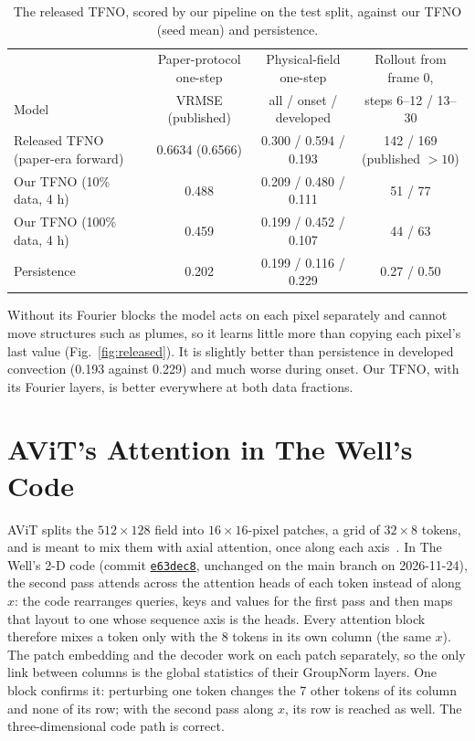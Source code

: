\documentclass[11pt]{article}
\begin{document}
\begin{table}[tp]
\centering\footnotesize
\begin{tabular}{@{}lccc@{}}
\toprule
& Paper-protocol one-step & Physical-field one-step & Rollout from frame 0, \\
Model & VRMSE (published) & all / onset / developed & steps 6--12 / 13--30 \\
\midrule
Released TFNO (paper-era forward) & 0.6634 (0.6566) & 0.300 / 0.594 / 0.193 & 142 / 169 (published $>10$) \\
Our TFNO (10\% data, 4 h) & 0.488 & 0.209 / 0.480 / 0.111 & 51 / 77 \\
Our TFNO (100\% data, 4 h) & 0.459 & 0.199 / 0.452 / 0.107 & 44 / 63 \\
Persistence & 0.202 & 0.199 / 0.116 / 0.229 & 0.27 / 0.50 \\
\bottomrule
\end{tabular}
\caption{The released TFNO, scored by our pipeline on the test split, against our TFNO (seed mean) and
persistence.}
\label{tab:released_tfno}
\end{table}

Without its Fourier blocks the model acts on each pixel separately and cannot move structures such as plumes, so it
learns little more than copying each pixel's last value (Fig.~\ref{fig:released}). It is slightly better than
persistence in developed convection (0.193 against 0.229) and much worse during onset. Our TFNO, with its Fourier
layers, is better everywhere at both data fractions.

\section{AViT's Attention in The Well's Code}
\label{app:avit}

AViT splits the $512\times128$ field into $16\times16$-pixel patches, a grid of $32\times8$ tokens, and is meant to mix
them with axial attention, once along each axis~\cite{mccabe2024mpp}. In The Well's 2-D code (commit
\href{https://github.com/PolymathicAI/the_well/blob/e63dec8ded515be864755eaf595d39fea409e335/the_well/benchmark/models/avit/__init__.py\#L141-L144}{\texttt{e63dec8}},
unchanged on the main branch on 2026-11-24), the second pass attends across the attention heads of each token instead
of along $x$: the code rearranges queries, keys and values for the first pass and then maps that layout to one whose
sequence axis is the heads. Every attention block therefore mixes a token only with the 8 tokens in its own column
(the same $x$). The patch embedding and the decoder work on each patch separately, so the only link between columns
is the global statistics of their GroupNorm layers. One block confirms it: perturbing one token changes the 7 other
tokens of its column and none of its row; with the second pass along $x$, its row is reached as well. The
three-dimensional code path is correct.
\end{document}
